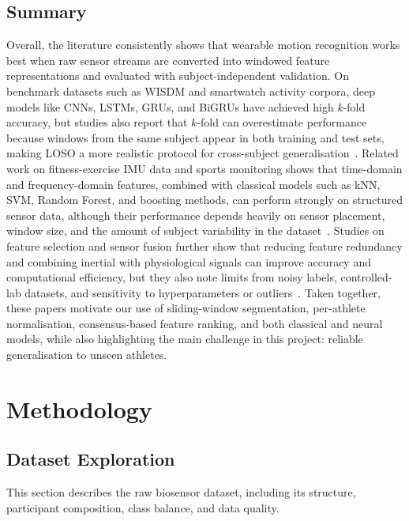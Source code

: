 \documentclass[12pt,a4paper]{cibb}
\begin{document}
\subsection{Summary}
Overall, the literature consistently shows that wearable motion recognition works best when raw sensor streams are converted into windowed feature representations and evaluated with subject-independent validation. On benchmark datasets such as WISDM and smartwatch activity corpora, deep models like CNNs, LSTMs, GRUs, and BiGRUs have achieved high $k$-fold accuracy, but studies also report that $k$-fold can overestimate performance because windows from the same subject appear in both training and test sets, making LOSO a more realistic protocol for cross-subject generalisation~\cite{10962074,9144538}. Related work on fitness-exercise IMU data and sports monitoring shows that time-domain and frequency-domain features, combined with classical models such as kNN, SVM, Random Forest, and boosting methods, can perform strongly on structured sensor data, although their performance depends heavily on sensor placement, window size, and the amount of subject variability in the dataset~\cite{Vitali2020,11264792,10689691}. Studies on feature selection and sensor fusion further show that reducing feature redundancy and combining inertial with physiological signals can improve accuracy and computational efficiency, but they also note limits from noisy labels, controlled-lab datasets, and sensitivity to hyperparameters or outliers~\cite{bennasar2022significant,gilmore2024fusion,freund1997adaboost,breiman2001random,cortes1995svm,chen2016xgboost,friedman2001gbm,scikit-learn}. Taken together, these papers motivate our use of sliding-window segmentation, per-athlete normalisation, consensus-based feature ranking, and both classical and neural models, while also highlighting the main challenge in this project: reliable generalisation to unseen athletes.



\section{Methodology}
\label{sec:DATA}
\subsection{Dataset Exploration}
This section describes the raw biosensor dataset, including its structure,
participant composition, class balance, and data quality.
\end{document}
